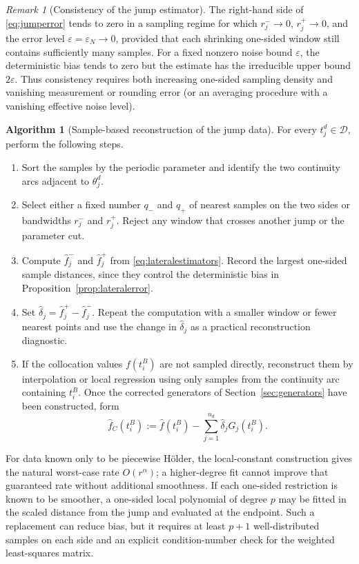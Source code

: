 \documentclass[11pt,a4paper]{amsart}
\theoremstyle{plain}
\theoremstyle{definition}
\newtheorem{algorithm}[theorem]{Algorithm}
\theoremstyle{remark}
\newtheorem{remark}[theorem]{Remark}
\newcommand{\D}{\mathcal D}
\begin{document}
\begin{remark}[Consistency of the jump estimator]\label{rem:lateral-consistency}
The right-hand side of \eqref{eq:jumperror} tends to zero in a sampling regime for which $r_j^-\to0$, $r_j^+\to0$, and the error level $\varepsilon=\varepsilon_N\to0$, provided that each shrinking one-sided window still contains sufficiently many samples.  For a fixed nonzero noise bound $\varepsilon$, the deterministic bias tends to zero but the estimate has the irreducible upper bound $2\varepsilon$.  Thus consistency requires both increasing one-sided sampling density and vanishing measurement or rounding error (or an averaging procedure with a vanishing effective noise level).
\end{remark}

\begin{algorithm}[Sample-based reconstruction of the jump data]\label{alg:lateral}
For every $t_j^d\in\D$, perform the following steps.
\begin{enumerate}[label=\textbf{Step \arabic*.},leftmargin=2.6cm]
\item Sort the samples by the periodic parameter and identify the two continuity arcs adjacent to $\theta_j^d$.
\item Select either a fixed number $q_-$ and $q_+$ of nearest samples on the two sides or bandwidths $r_j^-$ and $r_j^+$.  Reject any window that crosses another jump or the parameter cut.
\item Compute $\widehat f_j^-$ and $\widehat f_j^+$ from \eqref{eq:lateralestimators}.  Record the largest one-sided sample distances, since they control the deterministic bias in Proposition~\ref{prop:lateralerror}.
\item Set $\widehat\delta_j=\widehat f_j^+-\widehat f_j^-$.  Repeat the computation with a smaller window or fewer nearest points and use the change in $\widehat\delta_j$ as a practical reconstruction diagnostic.
\item If the collocation values $f(t_i^B)$ are not sampled directly, reconstruct them by interpolation or local regression using only samples from the continuity arc containing $t_i^B$.  Once the corrected generators of Section~\ref{sec:generators} have been constructed, form
\[
        \widehat f_C(t_i^B)
        :=\widehat f(t_i^B)-\sum_{j=1}^{n_d}\widehat\delta_jG_j(t_i^B).
\]
\end{enumerate}
\end{algorithm}

For data known only to be piecewise H\"older, the local-constant construction gives the natural worst-case rate $O(r^\alpha)$; a higher-degree fit cannot improve that guaranteed rate without additional smoothness.  If each one-sided restriction is known to be smoother, a one-sided local polynomial of degree $p$ may be fitted in the scaled distance from the jump and evaluated at the endpoint.  Such a replacement can reduce bias, but it requires at least $p+1$ well-distributed samples on each side and an explicit condition-number check for the weighted least-squares matrix.
\end{document}
